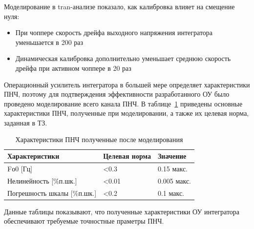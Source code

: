 \documentclass[a4paper,12pt,oneside]{scrartcl}
\begin{document}
Моделирование в tran-анализе показало, как калибровка влияет на смещение нуля:

\begin{itemize}
    \item При чоппере скорость дрейфа выходного напряжения интегратора уменьшается в 200 раз
    \item Динамическая калибровка дополнительно уменьшает среднюю скорость дрейфа при активном чоппере в 20 раз
\end{itemize}

Операционный усилитель интегратора в большей мере определяет характеристики ПНЧ, поэтому для подтверждения эффективности разработанного ОУ  было проведено моделирование всего канала ПНЧ. В таблице~\ref{Tab} приведены основные характеристики ПНЧ, полученные при моделировании, а также их целевая норма, заданная в ТЗ.

\begin{table}[!htb]
\centering
\caption{Характеристики ПНЧ полученные после моделирования}
\label{Tab}
\begin{tabular}{|l|l|l|}
\hline
Характеристики                   & Целевая норма    & Значение    \\\hline
Fо0  {[}Гц{]}                    & <0.3             & 0.15 макс.  \\\hline
Нелинейность  {[}\%п.шк.{]}      & <0.01            & 0.005 макс. \\\hline
Погрешность  шкалы {[}\%п.шк.{]} & <0.2             & 0.1 макс.   \\\hline
\end{tabular}
\end{table}
\FloatBarrier


Данные таблицы показывают, что полученные характеристики ОУ интегратора обеспечивают требуемые точностные праметры ПНЧ.





\end{document}
